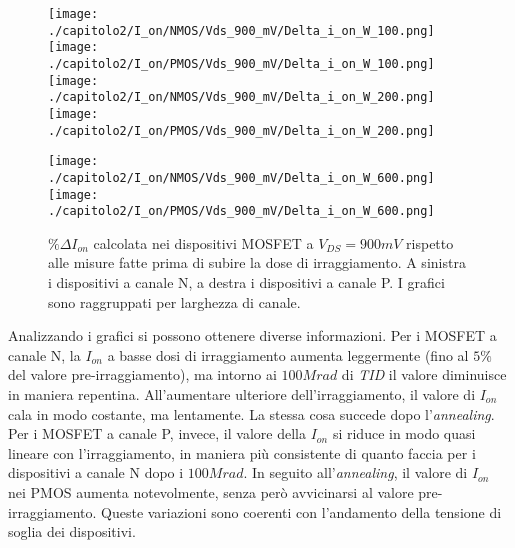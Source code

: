 \begin{figure}[h]
    \centering
    \texttt{[image: ./capitolo2/I\_on/NMOS/Vds\_900\_mV/Delta\_i\_on\_W\_100.png]}
    \texttt{[image: ./capitolo2/I\_on/PMOS/Vds\_900\_mV/Delta\_i\_on\_W\_100.png]}\\
    \vspace{0.2cm}
    \texttt{[image: ./capitolo2/I\_on/NMOS/Vds\_900\_mV/Delta\_i\_on\_W\_200.png]}
    \texttt{[image: ./capitolo2/I\_on/PMOS/Vds\_900\_mV/Delta\_i\_on\_W\_200.png]}\\
    \vspace{0.2cm}

    \texttt{[image: ./capitolo2/I\_on/NMOS/Vds\_900\_mV/Delta\_i\_on\_W\_600.png]}
    \texttt{[image: ./capitolo2/I\_on/PMOS/Vds\_900\_mV/Delta\_i\_on\_W\_600.png]}

    \caption[Dati $\% \Delta I_{on}$ a $V_{DS}=900mV$ ]{$\% \Delta I_{on}$ calcolata nei dispositivi MOSFET a $V_{DS} = 900mV$ rispetto alle misure fatte prima di subire la dose di irraggiamento. A sinistra i dispositivi a canale N, a destra i dispositivi a canale P. I grafici sono raggruppati per larghezza di canale.}
    \label{fig:delta_I_on_vds_900_mv}

\end{figure}

\vspace*{0.5cm}

Analizzando i grafici si possono ottenere diverse informazioni.
Per i MOSFET a canale N, la $I_{on}$ a basse dosi di irraggiamento aumenta leggermente (fino al $5\%$ del valore pre-irraggiamento), ma intorno ai $100 Mrad$ di \emph{TID} il valore diminuisce in maniera repentina. All'aumentare ulteriore dell'irraggiamento, il valore di $I_{on}$ cala in modo costante, ma lentamente. La stessa cosa succede dopo l'\emph{annealing}. Per i MOSFET a canale P, invece, il valore della $I_{on}$ si riduce in modo quasi lineare con l'irraggiamento, in maniera più consistente di quanto faccia per i dispositivi a canale N dopo i $100 Mrad$. In seguito all'\emph{annealing}, il valore di $I_{on}$ nei PMOS aumenta notevolmente, senza però avvicinarsi al valore pre-irraggiamento. Queste variazioni sono coerenti con l'andamento della tensione di soglia dei dispositivi. 


